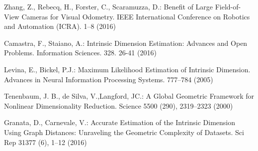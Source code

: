 \documentclass[conference]{IEEEtran} %
\begin{document}
\begin{thebibliography}{100}
Zhang, Z., Rebecq, H., Forster, C., Scaramuzza, D.:
Benefit of Large Field-of-View Cameras for Visual Odometry.
IEEE International Conference on Robotics and Automation (ICRA).
1--8 (2016)

Camastra, F., Staiano, A.:
Intrinsic Dimension Estimation: Advances and Open Problems.
Information Sciences. 328. 26-41 (2016)

Levina, E., Bickel, P.J.:
Maximum Likelihood Estimation of Intrinsic Dimension.
Advances in Neural Information Processing Systems.
777--784 (2005)

Tenenbaum, J. B., de Silva, V.,Langford, JC.:
A Global Geometric Framework for Nonlinear Dimensionality Reduction.
Science 5500 (290), 2319--2323 (2000)

Granata, D., Carnevale, V.:
Accurate Estimation of the Intrinsic Dimension Using Graph Distances: Unraveling the Geometric Complexity of Datasets.
Sci Rep 31377 (6),
1--12 (2016)

\end{thebibliography}
\end{document}
